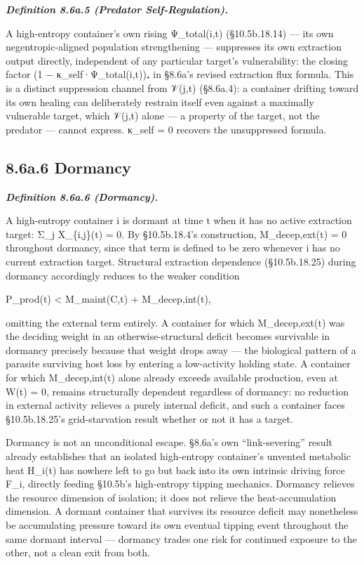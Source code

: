 \documentclass[
]{article}
\begin{document}
\emph{\textbf{Definition 8.6a.5 (Predator Self-Regulation).}}

A high-entropy container's own rising Ψ\_total(i,t) (§10.5b.18.14) ---
its own negentropic-aligned population strengthening --- suppresses its
own extraction output directly, independent of any particular target's
vulnerability: the closing factor (1 − κ\_self·Ψ\_total(i,t))₊ in
§8.6a's revised extraction flux formula. This is a distinct suppression
channel from 𝒱(j,t) (§8.6a.4): a container drifting toward its own
healing can deliberately restrain itself even against a maximally
vulnerable target, which 𝒱(j,t) alone --- a property of the target, not
the predator --- cannot express. κ\_self = 0 recovers the unsuppressed
formula.

\hypertarget{a.6-dormancy}{%
\subsection{8.6a.6 Dormancy}\label{a.6-dormancy}}

\emph{\textbf{Definition 8.6a.6 (Dormancy).}}

A high-entropy container i is dormant at time t when it has no active
extraction target: Σ\_j X\_\{i,j\}(t) = 0. By §10.5b.18.4's
construction, M\_decep,ext(t) = 0 throughout dormancy, since that term
is defined to be zero whenever i has no current extraction target.
Structural extraction dependence (§10.5b.18.25) during dormancy
accordingly reduces to the weaker condition

P\_prod(t) \textless{} M\_maint(C,t) + M\_decep,int(t),

omitting the external term entirely. A container for which
M\_decep,ext(t) was the deciding weight in an otherwise-structural
deficit becomes survivable in dormancy precisely because that weight
drops away --- the biological pattern of a parasite surviving host loss
by entering a low-activity holding state. A container for which
M\_decep,int(t) alone already exceeds available production, even at W(t)
= 0, remains structurally dependent regardless of dormancy: no reduction
in external activity relieves a purely internal deficit, and such a
container faces §10.5b.18.25's grid-starvation result whether or not it
has a target.

Dormancy is not an unconditional escape. §8.6a's own ``link-severing''
result already establishes that an isolated high-entropy container's
unvented metabolic heat H\_i(t) has nowhere left to go but back into its
own intrinsic driving force F\_i, directly feeding §10.5b's high-entropy
tipping mechanics. Dormancy relieves the resource dimension of
isolation; it does not relieve the heat-accumulation dimension. A
dormant container that survives its resource deficit may nonetheless be
accumulating pressure toward its own eventual tipping event throughout
the same dormant interval --- dormancy trades one risk for continued
exposure to the other, not a clean exit from both.
\end{document}
